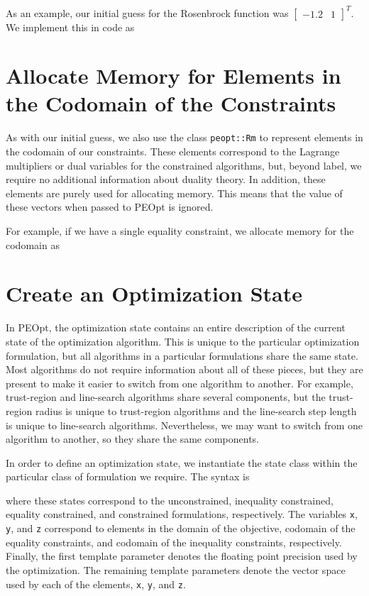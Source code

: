 \documentclass{report}
\begin{document}
        As an example, our initial guess for the Rosenbrock function was $\begin{bmatrix}-1.2 & 1\end{bmatrix}^T$.  We implement this in code as


\section{Allocate Memory for Elements in the Codomain of the Constraints}

        As with our initial guess, we also use the class \texttt{peopt::Rm} to represent elements in the codomain of our constraints.  These elements correspond to the Lagrange multipliers or dual variables for the constrained algorithms, but, beyond label, we require no additional information about duality theory.  In addition, these elements are purely used for allocating memory.  This means that the value of these vectors when passed to PEOpt is ignored.

        For example, if we have a single equality constraint, we allocate memory for the codomain as


\section{Create an Optimization State}\label{sec:State}

        In PEOpt, the optimization state contains an entire description of the current state of the optimization algorithm.  This is unique to the particular optimization formulation, but all algorithms in a particular formulations share the same state.  Most algorithms do not require information about all of these pieces, but they are present to make it easier to switch from one algorithm to another.  For example, trust-region and line-search algorithms share several components, but the trust-region radius is unique to trust-region algorithms and the line-search step length is unique to line-search algorithms.  Nevertheless, we may want to switch from one algorithm to another, so they share the same components.

        In order to define an optimization state, we instantiate the state class within the particular class of formulation we require.  The syntax is

where these states correspond to the unconstrained, inequality constrained, equality constrained, and constrained formulations, respectively.  The variables \texttt{x}, \texttt{y}, and \texttt{z} correspond to elements in the domain of the objective, codomain of the equality constraints, and codomain of the inequality constraints, respectively.  Finally, the first template parameter denotes the floating point precision used by the optimization.  The remaining template parameters denote the vector space used by each of the elements, \texttt{x}, \texttt{y}, and \texttt{z}. 
\end{document}
